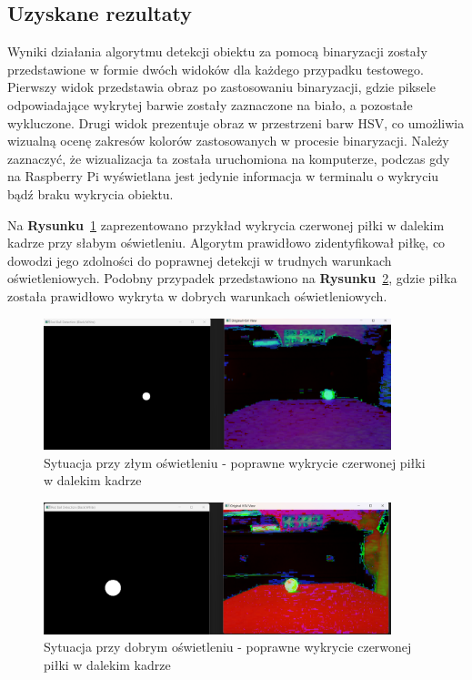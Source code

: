\documentclass[a4paper,twoside,12pt]{book}
\begin{document}
\newpage
\subsection{Uzyskane rezultaty}
Wyniki działania algorytmu detekcji obiektu za pomocą binaryzacji zostały przedstawione w formie dwóch widoków dla każdego przypadku testowego. Pierwszy widok przedstawia obraz po zastosowaniu binaryzacji, gdzie piksele odpowiadające wykrytej barwie zostały zaznaczone na biało, a pozostałe wykluczone. Drugi widok prezentuje obraz w przestrzeni barw HSV, co umożliwia wizualną ocenę zakresów kolorów zastosowanych w procesie binaryzacji. Należy zaznaczyć, że wizualizacja ta została uruchomiona na komputerze, podczas gdy na Raspberry Pi wyświetlana jest jedynie informacja w terminalu o wykryciu bądź braku wykrycia obiektu.

Na \textbf{Rysunku}~\ref{fig:Wykrycie piłki6} zaprezentowano przykład wykrycia czerwonej piłki w dalekim kadrze przy słabym oświetleniu. Algorytm prawidłowo zidentyfikował piłkę, co dowodzi jego zdolności do poprawnej detekcji w trudnych warunkach oświetleniowych. Podobny przypadek przedstawiono na \textbf{Rysunku}~\ref{fig:Wykrycie piłki7}, gdzie piłka została prawidłowo wykryta w dobrych warunkach oświetleniowych.

\begin{figure}[h]
    \centering
    \includegraphics[width=0.9\textwidth]{Images/Porownanie/Binaryzacja/Zrzut ekranu 2025-01-02 193719.png}
    \caption{Sytuacja przy złym oświetleniu - poprawne wykrycie czerwonej piłki w dalekim kadrze}
    \label{fig:Wykrycie piłki6}
\end{figure}
\begin{figure}[h]
    \centering
    \includegraphics[width=0.9\textwidth]{Images/Porownanie/Binaryzacja/Zrzut ekranu 2025-01-02 193549.png}
    \caption{Sytuacja przy dobrym oświetleniu - poprawne wykrycie czerwonej piłki w dalekim kadrze}
    \label{fig:Wykrycie piłki7}
\end{figure}
\end{document}

